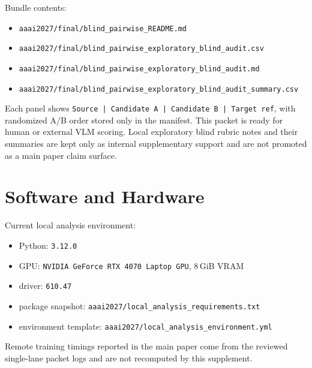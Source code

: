 \documentclass[letterpaper]{article}
\begin{document}
Bundle contents:
\begin{itemize}
\item \texttt{aaai2027/final/blind\_pairwise\_README.md}
\item \texttt{aaai2027/final/blind\_pairwise\_exploratory\_blind\_audit.csv}
\item \texttt{aaai2027/final/blind\_pairwise\_exploratory\_blind\_audit.md}
\item \texttt{aaai2027/final/blind\_pairwise\_exploratory\_blind\_audit\_summary.csv}
\end{itemize}

Each panel shows \texttt{Source | Candidate A | Candidate B | Target ref}, with randomized A/B order stored only in the manifest. This packet is ready for human or external VLM scoring. Local exploratory blind rubric notes and their summaries are kept only as internal supplementary support and are not promoted as a main paper claim surface.

\section{Software and Hardware}
Current local analysis environment:
\begin{itemize}
\item Python: \texttt{3.12.0}
\item GPU: \texttt{NVIDIA GeForce RTX 4070 Laptop GPU}, 8\,GiB VRAM
\item driver: \texttt{610.47}
\item package snapshot: \texttt{aaai2027/local\_analysis\_requirements.txt}
\item environment template: \texttt{aaai2027/local\_analysis\_environment.yml}
\end{itemize}
Remote training timings reported in the main paper come from the reviewed single-lane packet logs and are not recomputed by this supplement.
\end{document}
